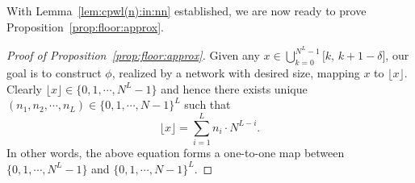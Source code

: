 \documentclass[11pt,a4paper]{article}
\begin{document}
With Lemma~\ref{lem:cpwl(n):in:nn} established, we are now ready to prove Proposition~\ref{prop:floor:approx}.

\begin{proof}[Proof of Proposition~\ref{prop:floor:approx}]
Given any $x\in \bigcup_{k=0}^{N^L-1}\big[k,\, k+1-\delta\big]$, our goal is to construct $\phi$, realized by a network with desired size, mapping $x$ to $\lfloor x\rfloor$.
Clearly  $\lfloor x\rfloor\in \{0,1,\cdots,N^L-1\}$ and hence there exists unique $(n_1,n_2,\cdots,n_L)\in \{0,1,\cdots,N-1\}^L$ such that
    \begin{equation}\label{eq:floor:x:decomposition}
        \lfloor x\rfloor= \sum_{i=1}^L n_i\cdot N^{L-i}.
    \end{equation}
In other words, the above equation forms a one-to-one map between $\{0,1,\cdots,N^L-1\}$ and $\{0,1,\cdots,N-1\}^L$.


\end{proof}
\end{document}
